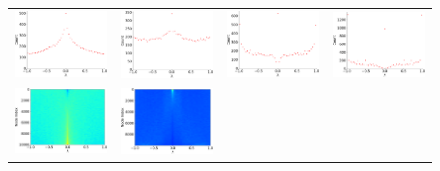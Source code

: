 \documentclass[senior,final,11pt]{iscs-thesis}
\begin{document}
\begin{figure}[htbp]
  \setlength\tabcolsep{0pt}
  \hspace{-3.0cm}
  \begin{tabular}{cccc}
    \includegraphics[width=45mm]{figure/grid_graph_deleted_dim(100,100)_pdel00txt_dos.png} &
    \includegraphics[width=45mm]{figure/grid_graph_deleted_dim(100,100)_pdel02txt_dos.png} &
    \includegraphics[width=45mm]{figure/grid_graph_deleted_dim(100,100)_pdel04txt_dos.png} &
    \includegraphics[width=45mm]{figure/grid_graph_deleted_dim(100,100)_pdel06txt_dos.png} \\
    \includegraphics[width=45mm]{figure/grid_graph_deleted_dim(100,100)_pdel00txt_pdos.png} &
    \includegraphics[width=45mm]{figure/grid_graph_deleted_dim(100,100)_pdel02txt_pdos.png} &

\end{tabular}
\end{figure}
\end{document}
